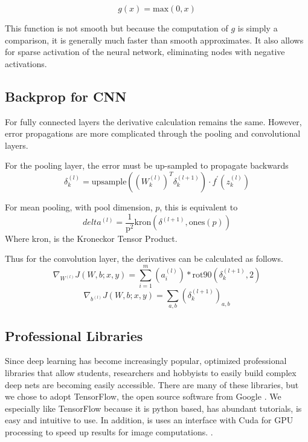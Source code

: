 \documentclass[12pt, twocolumn]{article}
\begin{document}
\begin{equation}
g(x)= \textrm{max}(0,x)
\end{equation}

This function is not smooth but because the computation of $g$ is simply a comparison, it is generally much faster than smooth approximates. It also allows for sparse activation of the neural network, eliminating nodes with negative activations. 

\subsection{Backprop for CNN}
For fully connected layers  the derivative calculation remains the same. However,  error propagations are more complicated through the pooling and convolutional layers. 

For the pooling layer, the error must be up-sampled to propagate backwards
\begin{equation}
\delta^{(l)}_k=\textrm{upsample}((W^{(l)}_k)^T \delta^{(l+1)}_k) \cdot f^{\prime}(z^{(l)}_k)
\end{equation}


For mean pooling, with pool dimension, $p$, this is equivalent to 
\begin{equation}
delta^{(l)}= \frac{1}{\textrm{p}^2}  \textrm{kron}(\delta^{(l+1)}, \textrm{ones}(p))
\end{equation}
Where kron, is the Kroneckor Tensor Product.

Thus for the convolution layer, the derivatives can be calculated as follows.
\begin{equation}
\nabla_{W^{(l)}}J(W,b;x,y) = \sum_{i=1}^m (a^{(l)}_i) \ast \textrm{rot90}( \delta^{(l+1)}_k,2)
\end{equation}
\begin{equation}
\nabla_{b^{(l)}}J(W,b;x,y)= \sum_{a,b}(\delta^{(l+1)}_k)_{a,b}
\end{equation}


\subsection{Professional Libraries}

Since deep learning has become increasingly popular, optimized professional libraries that allow students, researchers and hobbyists to easily build complex deep nets are becoming easily accessible. There are many of these libraries, but we chose to adopt TensorFlow, the open source software from Google \cite{TensorFlowGH}. We especially like TensorFlow because it is python based, has abundant tutorials, is easy and intuitive to use. In addition, is uses an interface with Cuda for GPU processing to speed up results for image computations. \cite{TensorFlowWeb}. 
\end{document}
